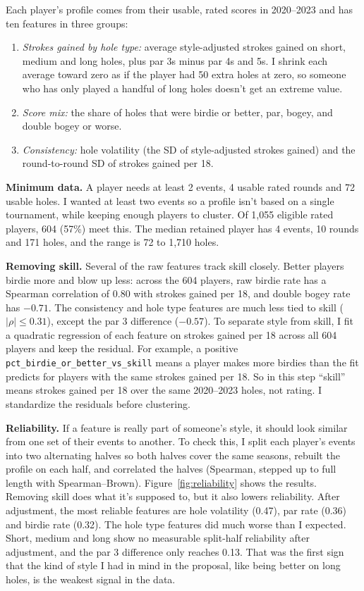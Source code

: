 \documentclass[10pt]{article}
\begin{document}
Each player's profile comes from their usable, rated scores in 2020--2023 and has ten features in three groups:
\begin{enumerate}
  \item \emph{Strokes gained by hole type:} average style-adjusted strokes gained on short, medium and long holes, plus par 3s minus par 4s and 5s. I shrink each average toward zero as if the player had 50 extra holes at zero, so someone who has only played a handful of long holes doesn't get an extreme value.
  \item \emph{Score mix:} the share of holes that were birdie or better, par, bogey, and double bogey or worse.
  \item \emph{Consistency:} hole volatility (the SD of style-adjusted strokes gained) and the round-to-round SD of strokes gained per 18.
\end{enumerate}

\textbf{Minimum data.} A player needs at least 2 events, 4 usable rated rounds and 72 usable holes. I wanted at least two events so a profile isn't based on a single tournament, while keeping enough players to cluster. Of 1,055 eligible rated players, 604 (57\%) meet this. The median retained player has 4 events, 10 rounds and 171 holes, and the range is 72 to 1,710 holes.

\textbf{Removing skill.} Several of the raw features track skill closely. Better players birdie more and blow up less: across the 604 players, raw birdie rate has a Spearman correlation of 0.80 with strokes gained per 18, and double bogey rate has $-0.71$. The consistency and hole type features are much less tied to skill ($|\rho| \leq 0.31$), except the par 3 difference ($-0.57$). To separate style from skill, I fit a quadratic regression of each feature on strokes gained per 18 across all 604 players and keep the residual. For example, a positive \texttt{pct\_birdie\_or\_better\_vs\_skill} means a player makes more birdies than the fit predicts for players with the same strokes gained per 18. So in this step ``skill'' means strokes gained per 18 over the same 2020--2023 holes, not rating. I standardize the residuals before clustering.

\textbf{Reliability.} If a feature is really part of someone's style, it should look similar from one set of their events to another. To check this, I split each player's events into two alternating halves so both halves cover the same seasons, rebuilt the profile on each half, and correlated the halves (Spearman, stepped up to full length with Spearman--Brown). Figure~\ref{fig:reliability} shows the results. Removing skill does what it's supposed to, but it also lowers reliability. After adjustment, the most reliable features are hole volatility (0.47), par rate (0.36) and birdie rate (0.32). The hole type features did much worse than I expected. Short, medium and long show no measurable split-half reliability after adjustment, and the par 3 difference only reaches 0.13. That was the first sign that the kind of style I had in mind in the proposal, like being better on long holes, is the weakest signal in the data.
\end{document}
